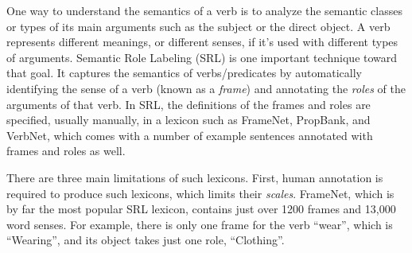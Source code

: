 One way to understand the semantics of a verb is to analyze
the semantic classes or types of its main arguments
such as the subject or the direct object. A verb represents different meanings,
or different senses, if it's used with different types of arguments.
%
Semantic Role Labeling (SRL) is one important technique toward that goal.
It captures the semantics of verbs/predicates by automatically identifying
the sense of a verb (known as a {\em frame}) and
annotating the {\em roles} of the arguments of that verb.
In SRL, the definitions of the frames
and roles are specified, usually manually, in a lexicon such as
FrameNet\cite{baker1998berkeley}, PropBank\cite{kingsbury2002treebank},
and VerbNet\cite{KipperDP00}, which comes with
a number of example sentences annotated with frames and roles as well.

There are three main limitations of such lexicons.
First, human annotation is required to produce such lexicons,
which limits their {\em scales}.
FrameNet, which is by far the most popular SRL lexicon,
contains just over 1200 frames and 13,000 word senses.
For example, there is only one frame for the verb ``wear'',
which is ``Wearing'', and its object takes just one role,
``Clothing''.

